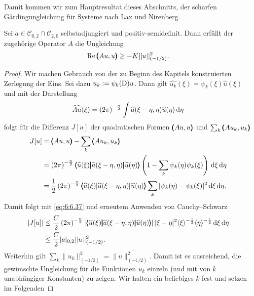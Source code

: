 Damit kommen wir zum Hauptresultat dieses Abschnitts, der scharfen G\r{a}rdingungleichung für Systeme nach Lax und Nirenberg.

\begin{thm}
Sei $a\in\mathcal{C}_{0,2}\cap\mathcal{C}_{2,0}$ selbstadjungiert und positiv-semidefinit. Dann erfüllt der zugehörige Operator $A$ die Ungleichung
\begin{equation}
	\operatorname{Re} \pmb(Au,u\pmb) \ge - K|| u||_{\left(-{1}/{2}\right)}^2.
\end{equation}
\end{thm}
\begin{proof}
Wir machen Gebrauch von der zu Beginn des Kapitels konstruierten Zerlegung der Eins. Sei dazu $	u_k:= \psi_k(\mathrm D)u$. Dann gilt $\widehat{u_k}(\xi) = \psi_k(\xi) \widehat{u}(\xi)$ und mit der Darstellung 
\begin{equation}
	\widehat{Au}(\xi) = \left(2\pi\right)^{-\frac{n}{2}}\int \widehat{a}(\xi-\eta,\eta)\widehat{u}(\eta)\,\mathrm d \eta
\end{equation}	 
folgt für die Differenz $J[u]$ der quadratischen Formen $\pmb(Au,u\pmb)$ und $\sum_k \pmb(Au_k,u_k\pmb)$
\begin{align}
 J[u]&=\pmb(Au,u\pmb)-\sum\limits_k \pmb(Au_k,u_k\pmb) \notag\\
& = \left(2\pi\right)^{-\frac{n}{2}}\relax \pmb\langle\widehat{u}(\xi)\pmb|\widehat{a}(\xi-\eta,\eta)\pmb|\widehat{u}(\eta)\pmb\rangle\left(1-\sum\limits_k \psi_k(\eta)\psi_k(\xi)\right)\,\mathrm d \xi\,\mathrm d\eta\notag\\
	&= \frac{1}{2}\left(2\pi\right)^{-\frac{n}{2}} \relax \pmb\langle\widehat{u}(\xi)\pmb|\widehat{a}(\xi-\eta,\eta)\pmb|\widehat{u}(\eta)\pmb\rangle\sum\limits_k\vert\psi_k(\eta)-\psi_k(\xi)\vert^2\,\mathrm d \xi\,\mathrm d\eta.
\end{align}
Damit folgt mit \eqref{eq:6:6.37} und erneutem Anwenden von Cauchy--Schwarz
\begin{equation}
\begin{split}	
| J[u] | &\le \frac{C}{2}\left(2\pi\right)^{-\frac{n}{2}}\relax| \pmb\langle\widehat{u}(\xi)\pmb|\widehat{a}(\xi-\eta,\eta)\pmb|\widehat{u}(\eta)\pmb\rangle| \, |\xi-\eta|^2\langle \xi\rangle^{-\frac{1}{2}} \langle\eta\rangle^{-\frac{1}{2}}\,\mathrm d \xi \,\mathrm d \eta\\ 
& \le \frac{C}{2}| a|_{0,2}|| u||_{(-{1}/{2})}^2.
\end{split}
\end{equation}
Weiterhin gilt $\sum_k \|u_k\|^2_{(-1/2)} = \|u\|^2_{(-1/2)}$.
Damit ist es ausreichend, die gewünschte Ungleichung für die Funktionen $u_k$ einzeln (und mit von $k$ unabhängiger Konstanten) zu zeigen. Wir halten ein beliebiges $k$ fest und setzen im Folgenden

\end{proof}
